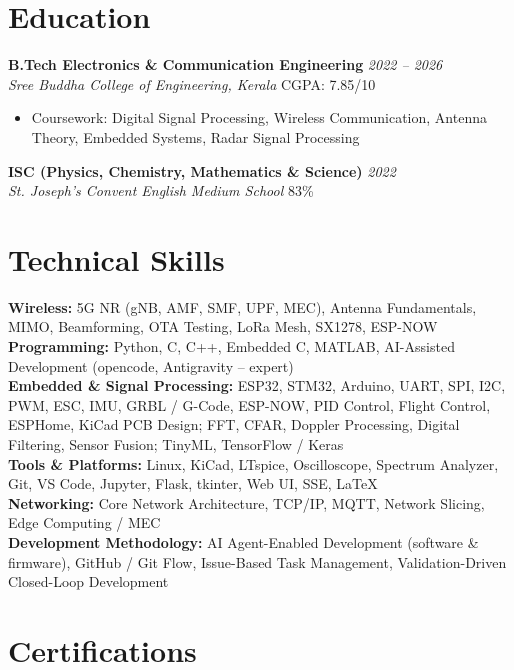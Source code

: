 \documentclass[10pt,a4paper]{article}
\newcommand{\role}[2]{\textbf{#1} \hfill \textit{#2}}
\newcommand{\org}[2]{\textit{#1} \hfill #2}
\newcommand{\skillgroup}[2]{\textbf{#1:} #2}
\begin{document}
\section*{Education}

\role{B.Tech Electronics \& Communication Engineering}{2022 -- 2026} \\
\org{Sree Buddha College of Engineering, Kerala}{CGPA: 7.85/10}
\begin{itemize}
    \item Coursework: Digital Signal Processing, Wireless Communication, Antenna Theory, Embedded Systems, Radar Signal Processing
\end{itemize}

\role{ISC (Physics, Chemistry, Mathematics \& Science)}{2022} \\
\org{St. Joseph's Convent English Medium School}{83\%}

\section*{Technical Skills}

\skillgroup{Wireless}{5G NR (gNB, AMF, SMF, UPF, MEC), Antenna Fundamentals, MIMO, Beamforming, OTA Testing, LoRa Mesh, SX1278, ESP-NOW} \\

\skillgroup{Programming}{Python, C, C++, Embedded C, MATLAB, AI-Assisted Development (opencode, Antigravity -- expert)} \\

\skillgroup{Embedded \& Signal Processing}{ESP32, STM32, Arduino, UART, SPI, I2C, PWM, ESC, IMU, GRBL / G-Code, ESP-NOW, PID Control, Flight Control, ESPHome, KiCad PCB Design; FFT, CFAR, Doppler Processing, Digital Filtering, Sensor Fusion; TinyML, TensorFlow / Keras} \\

\skillgroup{Tools \& Platforms}{Linux, KiCad, LTspice, Oscilloscope, Spectrum Analyzer, Git, VS Code, Jupyter, Flask, tkinter, Web UI, SSE, LaTeX} \\

\skillgroup{Networking}{Core Network Architecture, TCP/IP, MQTT, Network Slicing, Edge Computing / MEC} \\

\skillgroup{Development Methodology}{AI Agent-Enabled Development (software \& firmware), GitHub / Git Flow, Issue-Based Task Management, Validation-Driven Closed-Loop Development}

\section*{Certifications}
\end{document}
